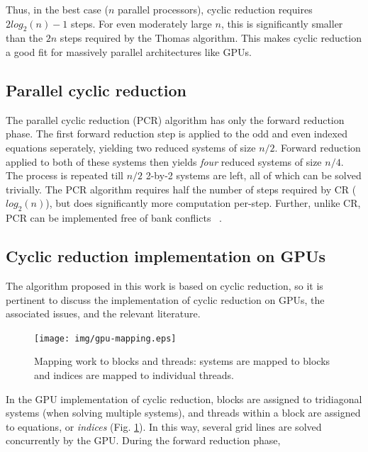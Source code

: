 Thus, in the best case ($n$ parallel processors),
cyclic reduction requires 
$2log_2(n) - 1$ steps.
For even moderately large $n$,
this is significantly smaller than
the $2n$ steps required by the Thomas algorithm.
This makes cyclic reduction a good fit
for massively parallel architectures like GPUs.

\subsection{Parallel cyclic reduction}

The parallel cyclic reduction (PCR) algorithm
has only the forward reduction phase.
The first forward reduction step is applied to
the odd and even indexed equations seperately,
yielding two reduced systems
of size $n/2$.
Forward reduction applied to both of these
systems then yields \emph{four} reduced
systems of size $n/4$.
The process is repeated till
$n/2$ 2-by-2 systems are left,
all of which can be solved trivially.
The PCR algorithm requires half the number of steps
required by CR ($log_2(n)$),
but does significantly more computation per-step.
Further, unlike CR,
PCR can be implemented free of bank conflicts
~\cite{Zhang2010FTS}.

\subsection{Cyclic reduction implementation on GPUs}
\label{subsec:cyclic-reduction-gpu-implementation}

The algorithm proposed in this work is based on cyclic reduction,
so it is pertinent to discuss the
implementation of cyclic reduction on GPUs,
the associated issues,
and the relevant literature.

\begin{figure}
\begin{center}
\texttt{[image: img/gpu-mapping.eps]}
\end{center}
\caption{Mapping work to blocks and threads:
systems are mapped to blocks and
indices are mapped to individual threads.}
\label{fig:gpu-mapping}
\end{figure}

In the GPU implementation of cyclic reduction,
blocks are assigned to tridiagonal systems
(when solving multiple systems),
and threads within a block 
are assigned to equations, or \emph{indices}
(Fig. \ref{fig:gpu-mapping}).
In this way, several grid lines are solved concurrently
by the GPU.
During the forward reduction phase,


